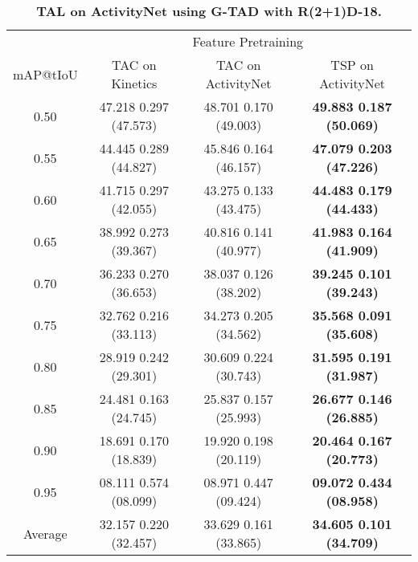 \documentclass[10pt,twocolumn,letterpaper]{article}
\begin{document}
\begin{table*}[t]
\begin{subtable}{\linewidth}
    \centering
    \vspace{5pt}
    \caption{\bf TAL on ActivityNet using G-TAD with R(2+1)D-18.}
    \vspace{-5pt}
    \begin{tabular}{c|ccc}
    \toprule 
            & \multicolumn{3}{c}{Feature Pretraining} \\ 
    mAP@tIoU& TAC on Kinetics                           & TAC on ActivityNet                        & TSP on ActivityNet \\ \midrule
    0.50    & 47.218 {\scriptsize  0.297} (47.573) & 48.701 {\scriptsize  0.170} (49.003) &\bf 49.883 {\scriptsize  0.187} (50.069) \\
    0.55    & 44.445 {\scriptsize  0.289} (44.827) & 45.846 {\scriptsize  0.164} (46.157) &\bf 47.079 {\scriptsize  0.203} (47.226) \\
    0.60    & 41.715 {\scriptsize  0.297} (42.055) & 43.275 {\scriptsize  0.133} (43.475) &\bf 44.483 {\scriptsize  0.179} (44.433) \\
    0.65    & 38.992 {\scriptsize  0.273} (39.367) & 40.816 {\scriptsize  0.141} (40.977) &\bf 41.983 {\scriptsize  0.164} (41.909) \\
    0.70    & 36.233 {\scriptsize  0.270} (36.653) & 38.037 {\scriptsize  0.126} (38.202) &\bf 39.245 {\scriptsize  0.101} (39.243) \\
    0.75    & 32.762 {\scriptsize  0.216} (33.113) & 34.273 {\scriptsize  0.205} (34.562) &\bf 35.568 {\scriptsize  0.091} (35.608) \\
    0.80    & 28.919 {\scriptsize  0.242} (29.301) & 30.609 {\scriptsize  0.224} (30.743) &\bf 31.595 {\scriptsize  0.191} (31.987) \\
    0.85    & 24.481 {\scriptsize  0.163} (24.745) & 25.837 {\scriptsize  0.157} (25.993) &\bf 26.677 {\scriptsize  0.146} (26.885) \\
    0.90    & 18.691 {\scriptsize  0.170} (18.839) & 19.920 {\scriptsize  0.198} (20.119) &\bf 20.464 {\scriptsize  0.167} (20.773) \\
    0.95    & 08.111 {\scriptsize  0.574} (08.099) & 08.971 {\scriptsize  0.447} (09.424) &\bf 09.072 {\scriptsize  0.434} (08.958) \\ \midrule
\rowcolor{Gray}
    Average & 32.157 {\scriptsize  0.220} (32.457) & 33.629 {\scriptsize  0.161} (33.865) &\bf 34.605 {\scriptsize  0.101} (34.709) \\ 
    \bottomrule
    \end{tabular}
\end{subtable}


\end{table*}
\end{document}
